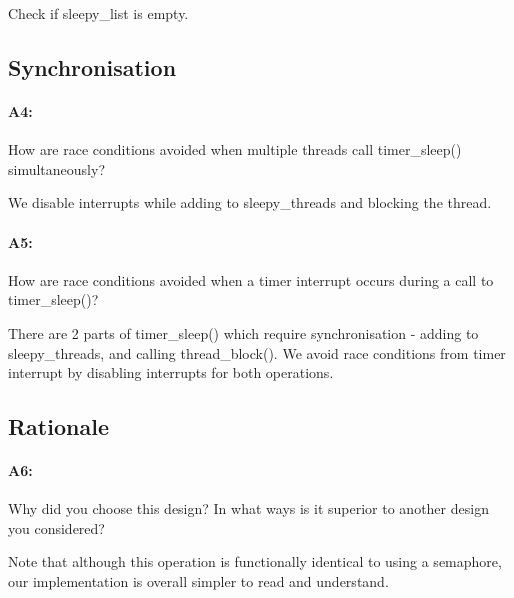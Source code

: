 \documentclass[11pt]{article}
\begin{document}
Check if sleepy\_list is empty.

\subsection{Synchronisation}
\paragraph{A4:}
How are race conditions avoided when multiple threads call timer\_sleep() simultaneously?

We disable interrupts while adding to sleepy\_threads and blocking the thread.

\paragraph{A5:}
How are race conditions avoided when a timer interrupt occurs during a call to timer\_sleep()?

There are 2 parts of timer\_sleep() which require synchronisation - adding to sleepy\_threads, and calling thread\_block(). We avoid race conditions from timer interrupt by disabling interrupts for both operations.

\subsection{Rationale}
\paragraph{A6:}
Why did you choose this design? In what ways is it superior to another design you considered?

Note that although this operation is functionally identical to using a semaphore, our implementation is overall simpler to read and understand.
\end{document}
